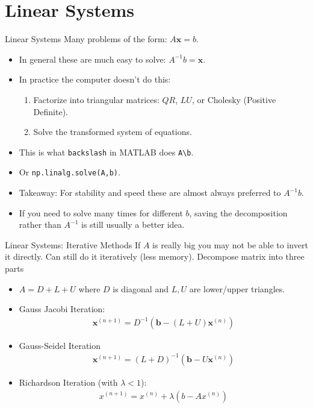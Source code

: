 \section{Linear Systems}
\begin{frame}{Linear Systems}
Many problems of the form: $A \mathbf{x} = b$.
\begin{itemize}
\item In general these are much easy to solve: $A^{-1} b = \mathbf{x}$.
\item In practice the computer doesn't do this:
\begin{enumerate}
\item Factorize into triangular matrices: $QR$, $LU$, or Cholesky (Positive Definite).
\item Solve the transformed system of equations.
\end{enumerate}
\item This is what \texttt{backslash} in MATLAB does \texttt{A\textbackslash  b}.
\item Or \texttt{np.linalg.solve(A,b)}.
\item Takeaway: For stability and speed these are almost always preferred to $A^{-1}b$.
\item If you need to solve many times for different $b$, saving the decomposition rather than $A^{-1}$ is still usually a better idea.
\end{itemize}
\end{frame}

\begin{frame}{Linear Systems: Iterative Methods}
If $A$ is really big you may not be able to invert it directly. Can still do it iteratively (less memory). Decompose matrix into three parts
\begin{itemize}
\item $A = D + L + U$ where $D$ is diagonal and $L,U$ are lower/upper triangles.
\item Gauss Jacobi Iteration:
\begin{align*}
\mathbf{x}^{(n+1)}=D^{-1}\left(\mathbf{b}-(L+U) \mathbf{x}^{(n)}\right)
\end{align*}
\item Gauss-Seidel Iteration
\begin{align*}
\mathbf{x}^{(n+1)}=(L+D)^{-1}\left(\mathbf{b}-U \mathbf{x}^{(n)}\right)
\end{align*}
\item Richardson Iteration (with $\lambda < 1$):
\begin{align*}
x^{(n+1)}=x^{(n)}+\lambda \left(b-A x^{(n)}\right)
\end{align*}
\end{itemize}
\end{frame}





